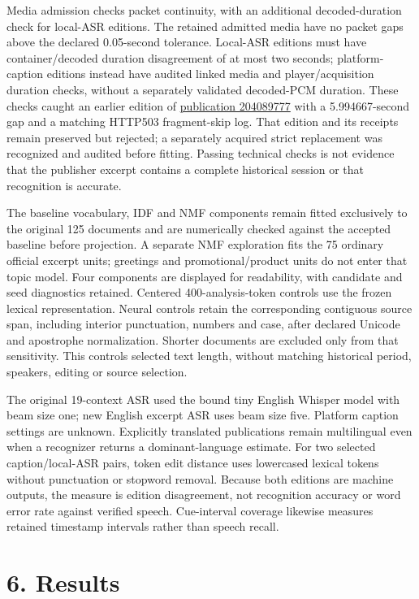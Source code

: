 \documentclass[
  11pt,
]{article}
\begin{document}
Media admission checks packet continuity, with an additional
decoded-duration check for local-ASR editions. The retained admitted
media have no packet gaps above the declared 0.05-second tolerance.
Local-ASR editions must have container/decoded duration disagreement of
at most two seconds; platform-caption editions instead have audited
linked media and player/acquisition duration checks, without a
separately validated decoded-PCM duration. These checks caught an
earlier edition of \href{https://vimeo.com/204089777}{publication
204089777} with a 5.994667-second gap and a matching HTTP503
fragment-skip log. That edition and its receipts remain preserved but
rejected; a separately acquired strict replacement was recognized and
audited before fitting. Passing technical checks is not evidence that
the publisher excerpt contains a complete historical session or that
recognition is accurate.

The baseline vocabulary, IDF and NMF components remain fitted
exclusively to the original 125 documents and are numerically checked
against the accepted baseline before projection. A separate NMF
exploration fits the 75 ordinary official excerpt units; greetings and
promotional/product units do not enter that topic model. Four components
are displayed for readability, with candidate and seed diagnostics
retained. Centered 400-analysis-token controls use the frozen lexical
representation. Neural controls retain the corresponding contiguous
source span, including interior punctuation, numbers and case, after
declared Unicode and apostrophe normalization. Shorter documents are
excluded only from that sensitivity. This controls selected text length,
without matching historical period, speakers, editing or source
selection.

The original 19-context ASR used the bound tiny English Whisper model
with beam size one; new English excerpt ASR uses beam size five.
Platform caption settings are unknown. Explicitly translated
publications remain multilingual even when a recognizer returns a
dominant-language estimate. For two selected caption/local-ASR pairs,
token edit distance uses lowercased lexical tokens without punctuation
or stopword removal. Because both editions are machine outputs, the
measure is edition disagreement, not recognition accuracy or word error
rate against verified speech. Cue-interval coverage likewise measures
retained timestamp intervals rather than speech recall.

\FloatBarrier

\section{6. Results}\label{results}
\end{document}
